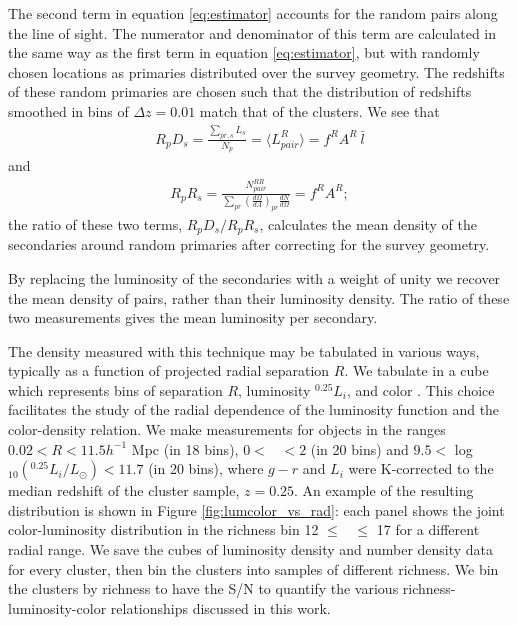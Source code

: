\documentclass{emulateapj}
\begin{document}
The second term in equation \ref{eq:estimator} accounts for the
random pairs along the line of sight.  The numerator and denominator of this term
are calculated in the same way as the first term in equation \ref{eq:estimator},
but with randomly chosen locations as primaries distributed over the survey geometry.
The redshifts of these random primaries are chosen such that the distribution of redshifts
smoothed in bins of $\Delta z = 0.01$ match that of the clusters. We see that
\begin{eqnarray}
R_p D_s = \frac{\sum_{pr,s}{L_s}}{N_p} 
  = \langle L^R_{pair} \rangle 
  = f^R A^R~\bar{l}
\end{eqnarray}
and
\begin{eqnarray}
R_p R_s = \frac{ N^{RR}_{pair} }{ \sum_{pr} \left( \frac{d\Omega}{dA} \right)_{pr} \frac{dN}{d\Omega}  }
  = f^R A^R;
\end{eqnarray}
the ratio of these two terms, $R_p D_s / R_p R_s$, calculates the mean 
density of the secondaries around random primaries after correcting for the survey geometry.

By replacing the luminosity of the secondaries with a weight of unity we recover
the mean density of pairs, rather than their luminosity density.  The ratio
of these two measurements gives the mean luminosity per secondary.


\begin{figure}
 \end{figure}


The density measured with this technique may be tabulated in various ways,
typically as a function of projected radial separation $R$.  We tabulate in a
cube which represents bins of separation $R$, luminosity $^{0.25}L_i$, and color \gmr.
This choice facilitates the study of the radial dependence of the luminosity function
and the color-density relation. We make measurements for objects in the ranges $0.02 <
R < 11.5 h^{-1}$ Mpc (in 18 bins), $0 <$ \gmr\ $< 2$ (in 20 bins) and $9.5 < $ log$_{10}(^{0.25}L_i/L_{\odot}) <
11.7$ (in 20 bins), where $g-r$ and $L_i$ were K-corrected to the median redshift of the cluster sample, $z = 0.25$.  An example of the resulting distribution is shown in Figure \ref{fig:lumcolor_vs_rad}: each panel shows the joint color-luminosity distribution in the richness bin 12 $\le$ \Ntwo\ $\le$ 17 for a different radial range. We save the cubes of luminosity density and number density data for every cluster, then bin the clusters into samples of different richness. We bin the clusters by richness to have the S/N to quantify the various richness-luminosity-color relationships discussed in this work.
\end{document}
